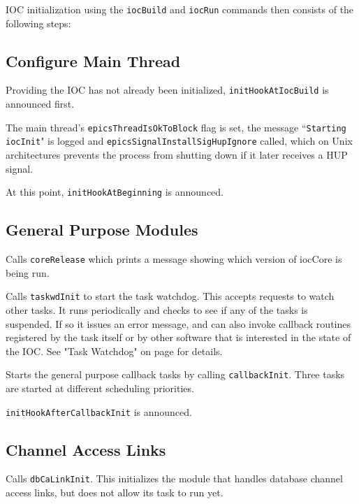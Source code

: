 IOC initialization using the \verb|iocBuild| and \verb|iocRun| commands then consists of the following steps:

\subsection{Configure Main Thread}

Providing the IOC has not already been initialized, \verb|initHookAtIocBuild| is announced first.

The main thread's \verb|epicsThreadIsOkToBlock| flag is set, the message ``\verb|Starting iocInit|" is logged and 
\verb|epicsSignalInstallSigHupIgnore| called, which on Unix architectures prevents the process from shutting down 
if it later receives a HUP signal.

At this point, \verb|initHookAtBeginning| is announced.

\subsection{General Purpose Modules}

Calls \verb|coreRelease| which prints a message showing which version of iocCore is being run.

Calls \verb|taskwdInit| to start the task watchdog.
This accepts requests to watch other tasks.
It runs periodically and checks to see if any of the tasks is suspended.
If so it issues an error message, and can also invoke callback routines registered by the task itself or by other software that is interested in the state of the IOC.
See "Task Watchdog" on page \pageref{Task Watchdog} for details.

Starts the general purpose callback tasks by calling \verb|callbackInit|.
Three tasks are started at different scheduling priorities.

\verb|initHookAfterCallbackInit| is announced.

\subsection{Channel Access Links}

Calls \verb|dbCaLinkInit|.
This initializes the module that handles database channel access links, but does not allow its task to run yet.

